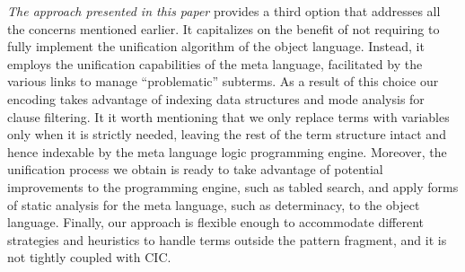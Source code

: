 \documentclass[sigconf,natbib=false,review]{acmart}
\begin{document}
\emph{The approach presented in this paper}
provides a third option that addresses all the concerns
mentioned earlier. It capitalizes on the benefit of not requiring to fully
implement
the unification algorithm of the object language. Instead, it employs the
unification capabilities of the meta language, facilitated by the various links
to manage ``problematic'' subterms. As a result of this choice our encoding takes
advantage of indexing data structures and mode analysis for clause filtering.
It it worth mentioning that we only replace terms with variables only
when it is strictly needed, leaving the rest of the term structure intact
and hence indexable by the meta language logic programming engine.
Moreover, the unification process we obtain is ready to take
advantage of potential improvements to the programming engine,
such as tabled search, and apply forms of static analysis for
the meta language, such as determinacy, to the object language. 
Finally, our approach is flexible enough to accommodate different strategies
and heuristics to handle terms outside the pattern fragment, and
it is not tightly coupled with CIC.






\printbibliography

\clearpage


\end{document}
